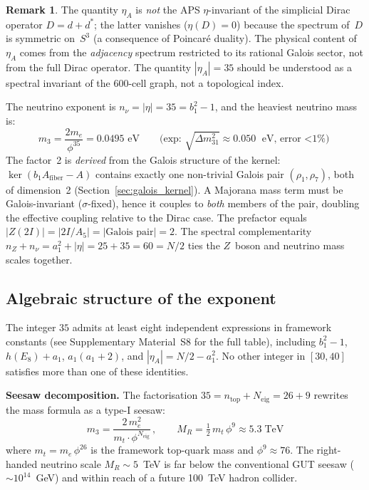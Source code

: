 \documentclass[12pt,a4paper]{article}
\theoremstyle{definition}
\newtheorem{remark}{Remark}
\begin{document}
\begin{remark}
The quantity $\eta_A$ is \emph{not} the APS $\eta$-invariant of the simplicial Dirac operator $D = d + d^*$; the latter vanishes ($\eta(D) = 0$) because the spectrum of~$D$ is symmetric on~$S^3$ (a consequence of Poincar\'e duality).  The physical content of~$\eta_A$ comes from the \emph{adjacency} spectrum restricted to its rational Galois sector, not from the full Dirac operator.  The quantity $|\eta_A| = 35$ should be understood as a spectral invariant of the 600-cell graph, not a topological index.
\end{remark}

The neutrino exponent is $n_\nu = |\eta| = 35 = b_1^2 - 1$, and the heaviest neutrino mass is:
\begin{equation}
\boxed{m_3 = \frac{2m_e}{\phi^{35}} = 0.0495 \text{ eV}} \qquad \text{(exp: } \sqrt{\Delta m^2_{31}} \approx 0.050 \text{ eV, error $<$1\%)}
\end{equation}
The factor~2 is \emph{derived} from the Galois structure of the kernel: $\ker(b_1 A_{\text{fiber}} - A)$ contains exactly one non-trivial Galois pair $(\rho_1, \rho_7)$, both of dimension~2 (Section~\ref{sec:galois_kernel}).  A Majorana mass term must be Galois-invariant ($\sigma$-fixed), hence it couples to \emph{both} members of the pair, doubling the effective coupling relative to the Dirac case.  The prefactor equals $|Z(2I)| = |2I/A_5| = |\text{Galois pair}| = 2$.  The spectral complementarity $n_Z + n_\nu = a_1^2 + |\eta| = 25 + 35 = 60 = N/2$ ties the $Z$~boson and neutrino mass scales together.

\subsection{Algebraic structure of the exponent}\label{sec:nu_exponent}

The integer $35$ admits at least eight independent expressions in framework constants (see Supplementary Material~S8 for the full table), including $b_1^2 - 1$, $h(E_8) + a_1$, $a_1(a_1+2)$, and $|\eta_A| = N/2 - a_1^2$.  No other integer in $[30,40]$ satisfies more than one of these identities.

\textbf{Seesaw decomposition.}  The factorisation $35 = n_{\text{top}} + N_{\text{eig}} = 26 + 9$ rewrites the mass formula as a type-I seesaw:
\begin{equation}
m_3 = \frac{2\,m_e^2}{m_t \cdot \phi^{N_{\text{eig}}}} \,,\qquad
M_R = \tfrac{1}{2}\,m_t\,\phi^{9} \approx 5.3\;\text{TeV}
\label{eq:seesaw}
\end{equation}
where $m_t = m_e\,\phi^{26}$ is the framework top-quark mass and $\phi^9 \approx 76$.  The right-handed neutrino scale $M_R \sim 5$~TeV is far below the conventional GUT seesaw ($\sim\!10^{14}$~GeV) and within reach of a future 100~TeV hadron collider.
\end{document}

